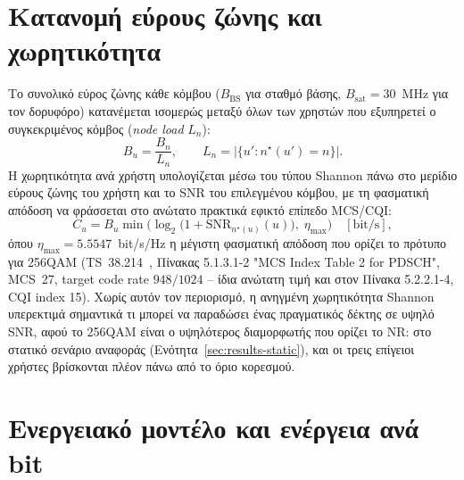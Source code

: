 \section{Κατανομή εύρους ζώνης και χωρητικότητα}
\label{sec:meth-capacity}

Το συνολικό εύρος ζώνης κάθε κόμβου ($B_{\text{BS}}$ για σταθμό βάσης,
$B_{\text{sat}} = 30$~MHz για τον δορυφόρο) κατανέμεται ισομερώς μεταξύ
όλων των χρηστών που εξυπηρετεί ο συγκεκριμένος κόμβος (\emph{node load}
$L_n$):
\begin{equation}
B_u = \frac{B_n}{L_n}, \qquad L_n = \big|\{u' : n^\star(u') = n\}\big|.
\label{eq:bw-split}
\end{equation}
Η χωρητικότητα ανά χρήστη υπολογίζεται μέσω του τύπου Shannon πάνω στο
μερίδιο εύρους ζώνης του χρήστη και το SNR του επιλεγμένου κόμβου, με τη
φασματική απόδοση να φράσσεται στο ανώτατο πρακτικά εφικτό επίπεδο
MCS/CQI:
\begin{equation}
C_u = B_u \min\!\Big(\log_2\!\big(1 + \text{SNR}_{n^\star(u)}(u)\big),\; \eta_{\max}\Big) \quad [\text{bit/s}],
\label{eq:shannon-capacity}
\end{equation}
όπου $\eta_{\max} = 5.5547$~bit/s/Hz η μέγιστη φασματική απόδοση που
ορίζει το πρότυπο για 256QAM (TS~38.214~\cite{ts38214}, Πίνακας
5.1.3.1-2 "MCS Index Table 2 for PDSCH", MCS~27, target code rate
$948/1024$ -- ίδια ανώτατη τιμή και στον Πίνακα 5.2.2.1-4, CQI index
15). Χωρίς αυτόν τον περιορισμό, η ανηγμένη χωρητικότητα Shannon
υπερεκτιμά σημαντικά τι μπορεί να παραδώσει ένας πραγματικός δέκτης σε
υψηλό SNR, αφού το 256QAM είναι ο υψηλότερος διαμορφωτής που ορίζει το
NR: στο στατικό σενάριο αναφοράς (Ενότητα~\ref{sec:results-static}), και
οι τρεις επίγειοι χρήστες βρίσκονται πλέον πάνω από το όριο κορεσμού.

\section{Ενεργειακό μοντέλο και ενέργεια ανά bit}
\label{sec:meth-energy}

